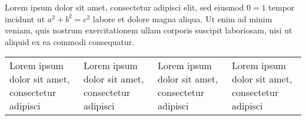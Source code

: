 Lorem ipsum dolor sit amet, consectetur adipisci elit, sed eiusmod
\(0 = 1\) tempor incidunt ut $a^{2} + b^{2} = c^{2}$ labore et dolore
magna aliqua.  Ut enim ad minim veniam, quis nostrum exercitationem
ullam corporis suscipit laboriosam, nisi ut aliquid ex ea commodi
consequatur.

\begin{tabular}{| l | l | l | l |}
  Lorem ipsum dolor sit amet, consectetur adipisci & Lorem ipsum dolor sit amet, consectetur adipisci & Lorem ipsum dolor sit amet, consectetur adipisci & Lorem ipsum dolor sit amet, consectetur adipisci
\end{tabular}
